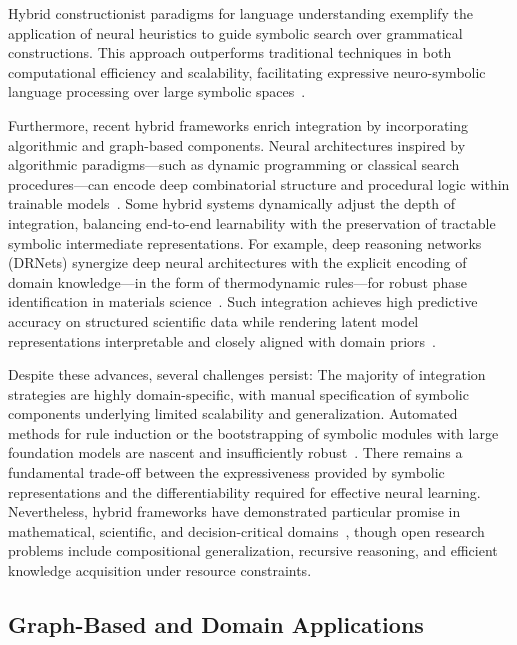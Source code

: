 \documentclass[sigconf]{acmart}
\begin{document}
Hybrid constructionist paradigms for language understanding exemplify the application of neural heuristics to guide symbolic search over grammatical constructions. This approach outperforms traditional techniques in both computational efficiency and scalability, facilitating expressive neuro-symbolic language processing over large symbolic spaces~\cite{ref54}.

Furthermore, recent hybrid frameworks enrich integration by incorporating algorithmic and graph-based components. Neural architectures inspired by algorithmic paradigms—such as dynamic programming or classical search procedures—can encode deep combinatorial structure and procedural logic within trainable models~\cite{ref5,ref56}. Some hybrid systems dynamically adjust the depth of integration, balancing end-to-end learnability with the preservation of tractable symbolic intermediate representations. For example, deep reasoning networks (DRNets) synergize deep neural architectures with the explicit encoding of domain knowledge—in the form of thermodynamic rules—for robust phase identification in materials science~\cite{ref45}. Such integration achieves high predictive accuracy on structured scientific data while rendering latent model representations interpretable and closely aligned with domain priors~\cite{ref45,ref93}.

Despite these advances, several challenges persist:
The majority of integration strategies are highly domain-specific, with manual specification of symbolic components underlying limited scalability and generalization.
Automated methods for rule induction or the bootstrapping of symbolic modules with large foundation models are nascent and insufficiently robust~\cite{ref1,ref22,ref45,ref49,ref54}.
There remains a fundamental trade-off between the expressiveness provided by symbolic representations and the differentiability required for effective neural learning.
Nevertheless, hybrid frameworks have demonstrated particular promise in mathematical, scientific, and decision-critical domains~\cite{ref1,ref5,ref10,ref11,ref42,ref45,ref49,ref54,ref68,ref86}, though open research problems include compositional generalization, recursive reasoning, and efficient knowledge acquisition under resource constraints.

\subsection{Graph-Based and Domain Applications}
\end{document}
